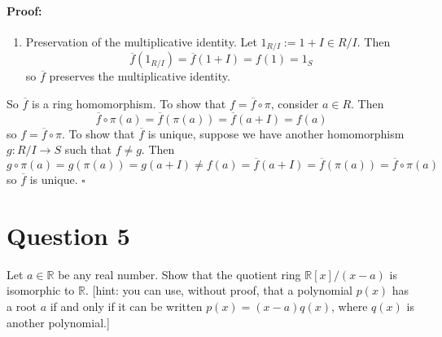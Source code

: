 \documentclass [12pt] {article}
\newcommand{\R}{\mathbb{R}}
\newenvironment{proof}{\paragraph{Proof:}}{\hfill$\square$}
\begin{document}
\begin{proof}
\begin{enumerate}
        \item Preservation of the multiplicative identity. Let $1_{R/I} := 1 + I \in R/I$. Then
            \[\overline{f}(1_{R/I}) = \overline{f}(1 + I) = f(1) = 1_S\]
            so $\overline{f}$ preserves the multiplicative identity.
    \end{enumerate}
    So $\overline{f}$ is a ring homomorphism. To show that $f = \overline{f} \circ \pi$, consider
    $a \in R$. Then
    \[\overline{f} \circ \pi (a) = \overline{f}(\pi(a)) = \overline{f}(a + I) = f(a)\]
    so $f = \overline{f} \circ \pi$. To show that $\overline{f}$ is unique, suppose we have another
    homomorphism $g : R/I \to S$ such that $f \neq g$. Then
    \[
        g \circ \pi (a) = g(\pi(a)) = g(a + I) 
        \neq f(a) 
        = \overline{f}(a + I) = \overline{f}(\pi(a)) = \overline{f} \circ \pi (a)
    \]
    so $\overline{f}$ is unique.
\end{proof}
\newpage

\section*{Question 5}
Let $a\in\R$ be any real number. Show that the quotient ring $\R[x]/(x-a)$ is isomorphic to $\R$. [hint: you can use, without proof, that a polynomial $p(x)$ has a root $a$ if and only if it can be written $p(x)=(x-a)q(x)$, where $q(x)$ is another polynomial.] 
\end{document}

